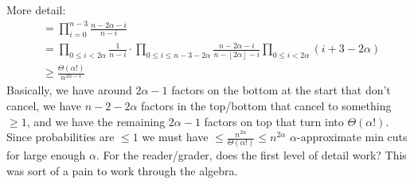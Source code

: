 \documentclass[12pt]{article}
\newcommand{\floor}[1]{\left\lfloor#1\right\rfloor}
\theoremstyle{definition}
\theoremstyle{remark}
\begin{document}
\begin{enumerate}[leftmargin=\labelsep]
		More detail:
		\begin{align*}
			&= \prod_{i=0}^{n-3} \frac{n-2\alpha-i}{n-i} \\
			&= \prod_{0 \leq i < 2\alpha} \frac{1}{n-i} \cdot \prod_{0 \leq i \leq n-3-2\alpha} \frac{n-2\alpha-i}{n-\floor{2\alpha}-i} \prod_{0 \leq i < 2\alpha} (i+3-2\alpha) \\
			&\geq \frac{\Theta(\alpha!)}{n^{2\alpha-1}}
		\end{align*}
		Basically, we have around $2\alpha-1$ factors on the bottom at the start that don't cancel, we have $n-2-2\alpha$ factors in the top/bottom that cancel to something $\geq 1$, and we have the remaining $2\alpha-1$ factors on top that turn into $\Theta(\alpha!)$. Since probabilities are $\leq 1$ we must have $\leq \frac{n^{2\alpha}}{\Theta(\alpha!)} \leq n^{2\alpha}$ $\alpha$-approximate min cuts for large enough $\alpha$. For the reader/grader, does the first level of detail work? This was sort of a pain to work through the algebra.
		

\end{enumerate}
\end{document}
